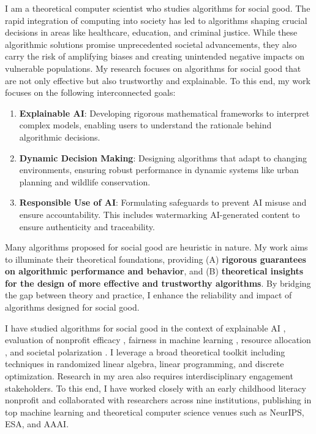 \documentclass[11pt]{article}
\begin{document}
{\setlength{\parindent}{0cm}
I am a theoretical computer scientist who studies algorithms for social good.
The rapid integration of computing into society has led to algorithms shaping crucial decisions in areas like healthcare, education, and criminal justice. While these algorithmic solutions promise unprecedented societal advancements, they also carry the risk of amplifying biases and creating unintended negative impacts on vulnerable populations. My research focuses on algorithms for social good that are not only effective but also trustworthy and explainable.
To this end, my work focuses on the following interconnected goals:
\begin{enumerate}
    \item \textbf{Explainable AI}: Developing rigorous mathematical frameworks to interpret complex models, enabling users to understand the rationale behind algorithmic decisions.
    \item \textbf{Dynamic Decision Making}: Designing algorithms that adapt to changing environments, ensuring robust performance in dynamic systems like urban planning and wildlife conservation.
    \item \textbf{Responsible Use of AI}: Formulating safeguards to prevent AI misuse and ensure accountability. This includes watermarking AI-generated content to ensure authenticity and traceability.
\end{enumerate}

Many algorithms proposed for social good are heuristic in nature. My work aims to illuminate their theoretical foundations, providing (A) \textbf{rigorous guarantees on algorithmic performance and behavior}, and (B) \textbf{theoretical insights for the design of more effective and trustworthy algorithms}.
By bridging the gap between theory and practice, I enhance the reliability and impact of algorithms designed for social good.

I have studied algorithms for social good in the context of explainable AI \cite{musco2024leverage,liu2024kernel}, evaluation of nonprofit efficacy \cite{witter2024benchmarking}, fairness in machine learning \cite{rosenblatt2023counterfactual,witter2024fairlyuncertain}, resource allocation \cite{hellerstein2022local,witter2024i,witter2024minimizing}, and societal polarization \cite{musco2022quantify}. I leverage a broad theoretical toolkit including techniques in randomized linear algebra, linear programming, and discrete optimization. Research in my area also requires interdisciplinary engagement stakeholders. To this end, I have worked closely with an early childhood literacy nonprofit and collaborated with researchers across nine institutions, publishing in top machine learning and theoretical computer science venues such as NeurIPS, ESA, and AAAI.

}
\end{document}
